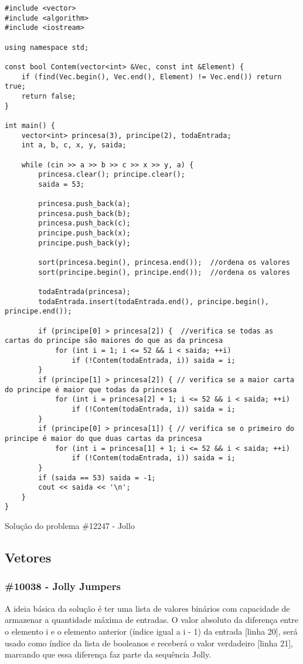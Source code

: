 \documentclass[a4paper,12pt]{scrartcl}
\begin{document}
\begin{listing}[H]
\begin{verbatim}
#include <vector>
#include <algorithm>
#include <iostream>

using namespace std;

const bool Contem(vector<int> &Vec, const int &Element) {
    if (find(Vec.begin(), Vec.end(), Element) != Vec.end()) return true;
    return false;
}

int main() {
    vector<int> princesa(3), principe(2), todaEntrada;
    int a, b, c, x, y, saida;

    while (cin >> a >> b >> c >> x >> y, a) {
        princesa.clear(); principe.clear();
        saida = 53;

        princesa.push_back(a);
        princesa.push_back(b);
        princesa.push_back(c);
        principe.push_back(x);
        principe.push_back(y);

        sort(princesa.begin(), princesa.end());  //ordena os valores
        sort(principe.begin(), principe.end());  //ordena os valores

        todaEntrada(princesa);
        todaEntrada.insert(todaEntrada.end(), principe.begin(), principe.end());

        if (principe[0] > princesa[2]) {  //verifica se todas as cartas do principe são maiores do que as da princesa
            for (int i = 1; i <= 52 && i < saida; ++i)
                if (!Contem(todaEntrada, i)) saida = i;
        }
        if (principe[1] > princesa[2]) { // verifica se a maior carta do principe é maior que todas da princesa
            for (int i = princesa[2] + 1; i <= 52 && i < saida; ++i)
                if (!Contem(todaEntrada, i)) saida = i;
        }
        if (principe[0] > princesa[1]) { // verifica se o primeiro do principe é maior do que duas cartas da princesa
            for (int i = princesa[1] + 1; i <= 52 && i < saida; ++i)
                if (!Contem(todaEntrada, i)) saida = i;
        }
        if (saida == 53) saida = -1;
        cout << saida << '\n';
    }
}
\end{verbatim}
\caption{\footnotesize{Solução do problema \#12247 - Jollo}}
\end{listing}

\subsection{Vetores}
\subsubsection{\#10038 - Jolly Jumpers}
A ideia básica da solução é ter uma lista de valores binários com capacidade de armazenar a quantidade máxima de entradas. O valor absoluto da diferença entre o elemento i e o elemento anterior (índice igual a i - 1) da entrada [linha 20], será usado como índice da lista de booleanos e receberá o valor verdadeiro [linha 21], marcando que essa diferença faz parte da sequência Jolly.
\end{document}
